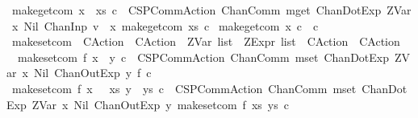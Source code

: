 \begin{isabellebody}
{\isacharbar}\ {\isachardoublequoteopen}make{\isacharunderscore}get{\isacharunderscore}com\ {\isacharparenleft}x\ {\isacharhash}\ xs{\isacharparenright}\ c\ {\isacharequal}\ {\isacharparenleft}CSPCommAction\ {\isacharparenleft}ChanComm\ {\isacharprime}{\isacharprime}mget{\isacharprime}{\isacharprime}\ {\isacharbrackleft}ChanDotExp\ {\isacharparenleft}ZVar\ {\isacharparenleft}x{\isacharcomma}\ Nil{\isacharparenright}{\isacharparenright}{\isacharcomma}\ ChanInp\ {\isacharparenleft}{\isacharprime}{\isacharprime}v{\isacharunderscore}{\isacharprime}{\isacharprime}\ {\isacharat}\ x{\isacharparenright}{\isacharbrackright}{\isacharparenright}\ {\isacharparenleft}make{\isacharunderscore}get{\isacharunderscore}com\ xs\ c{\isacharparenright}{\isacharparenright}{\isachardoublequoteclose}\isanewline
{\isacharbar}\ {\isachardoublequoteopen}make{\isacharunderscore}get{\isacharunderscore}com\ x\ c\ {\isacharequal}\ c{\isachardoublequoteclose}\isanewline
\isanewline
\ \isanewline
{}\isamarkupfalse%
\ make{\isacharunderscore}set{\isacharunderscore}com\ {\isacharcolon}{\isacharcolon}\ {\isachardoublequoteopen}{\isacharparenleft}CAction\ {\isasymRightarrow}\ CAction{\isacharparenright}\ {\isasymRightarrow}\ ZVar\ list\ {\isasymRightarrow}\ ZExpr\ list\ {\isasymRightarrow}\ CAction\ {\isasymRightarrow}\ CAction{\isachardoublequoteclose}\isanewline
{}\isanewline
\ \ {\isachardoublequoteopen}make{\isacharunderscore}set{\isacharunderscore}com\ f\ {\isacharbrackleft}{\isacharparenleft}x{\isacharcomma}\ {\isacharunderscore}{\isacharparenright}{\isacharbrackright}\ {\isacharbrackleft}y{\isacharbrackright}\ c\ {\isacharequal}\ {\isacharparenleft}CSPCommAction\ {\isacharparenleft}ChanComm\ {\isacharprime}{\isacharprime}mset{\isacharprime}{\isacharprime}\ {\isacharbrackleft}ChanDotExp\ {\isacharparenleft}ZVar\ {\isacharparenleft}x{\isacharcomma}\ Nil{\isacharparenright}{\isacharparenright}{\isacharcomma}\ ChanOutExp\ y{\isacharbrackright}{\isacharparenright}\ {\isacharparenleft}f\ c{\isacharparenright}{\isacharparenright}{\isachardoublequoteclose}\isanewline
{\isacharbar}\ {\isachardoublequoteopen}make{\isacharunderscore}set{\isacharunderscore}com\ f\ {\isacharparenleft}{\isacharparenleft}x{\isacharcomma}\ {\isacharunderscore}{\isacharparenright}\ {\isacharhash}\ xs{\isacharparenright}\ {\isacharparenleft}y\ {\isacharhash}\ ys{\isacharparenright}\ c\ {\isacharequal}\ {\isacharparenleft}CSPCommAction\ {\isacharparenleft}ChanComm\ {\isacharprime}{\isacharprime}mset{\isacharprime}{\isacharprime}\ {\isacharbrackleft}ChanDotExp\ {\isacharparenleft}ZVar\ {\isacharparenleft}x{\isacharcomma}\ Nil{\isacharparenright}{\isacharparenright}{\isacharcomma}\ ChanOutExp\ y{\isacharbrackright}{\isacharparenright}\ {\isacharparenleft}make{\isacharunderscore}set{\isacharunderscore}com\ f\ xs\ ys\ c{\isacharparenright}{\isacharparenright}{\isachardoublequoteclose}\isanewline

\end{isabellebody}
